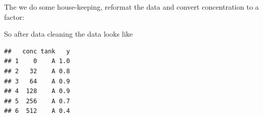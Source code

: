 The we do some house-keeping, reformat the data and convert concentration to a factor:

\begin{knitrout}
\color{fgcolor}\begin{kframe}
\begin{alltt}
 \hlkwb{<-}   \hlstd{=} \hlstd{,}  \hlstd{=} \hlstd{,}  \hlstd{=} \hlstd{)}
\hlopt{$} \hlkwb{<-} \hlopt{$}
\end{alltt}
\end{kframe}
\end{knitrout}

So after data cleaning the data looks like
\begin{knitrout}
\color{fgcolor}\begin{kframe}
\begin{alltt}
\end{alltt}
\begin{verbatim}
##   conc tank   y
## 1    0    A 1.0
## 2   32    A 0.8
## 3   64    A 0.9
## 4  128    A 0.9
## 5  256    A 0.7
## 6  512    A 0.4
\end{verbatim}
\end{kframe}
\end{knitrout}

